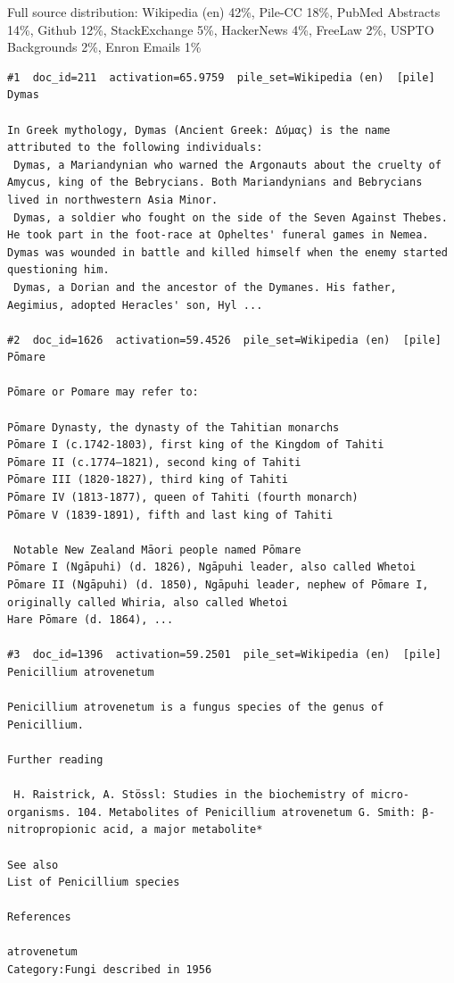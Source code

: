 Full source distribution: Wikipedia (en) 42\%, Pile-CC 18\%, PubMed Abstracts 14\%, Github 12\%, StackExchange 5\%, HackerNews 4\%, FreeLaw 2\%, USPTO Backgrounds 2\%, Enron Emails 1\%

\begin{verbatim}
#1  doc_id=211  activation=65.9759  pile_set=Wikipedia (en)  [pile]
Dymas

In Greek mythology, Dymas (Ancient Greek: Δύμας) is the name attributed to the following individuals:
 Dymas, a Mariandynian who warned the Argonauts about the cruelty of Amycus, king of the Bebrycians. Both Mariandynians and Bebrycians lived in northwestern Asia Minor.
 Dymas, a soldier who fought on the side of the Seven Against Thebes. He took part in the foot-race at Opheltes' funeral games in Nemea. Dymas was wounded in battle and killed himself when the enemy started questioning him.
 Dymas, a Dorian and the ancestor of the Dymanes. His father, Aegimius, adopted Heracles' son, Hyl ...

#2  doc_id=1626  activation=59.4526  pile_set=Wikipedia (en)  [pile]
Pōmare

Pōmare or Pomare may refer to:

Pōmare Dynasty, the dynasty of the Tahitian monarchs
Pōmare I (c.1742-1803), first king of the Kingdom of Tahiti
Pōmare II (c.1774–1821), second king of Tahiti
Pōmare III (1820-1827), third king of Tahiti
Pōmare IV (1813-1877), queen of Tahiti (fourth monarch)
Pōmare V (1839-1891), fifth and last king of Tahiti

 Notable New Zealand Māori people named Pōmare
Pōmare I (Ngāpuhi) (d. 1826), Ngāpuhi leader, also called Whetoi
Pōmare II (Ngāpuhi) (d. 1850), Ngāpuhi leader, nephew of Pōmare I, originally called Whiria, also called Whetoi
Hare Pōmare (d. 1864), ...

#3  doc_id=1396  activation=59.2501  pile_set=Wikipedia (en)  [pile]
Penicillium atrovenetum

Penicillium atrovenetum is a fungus species of the genus of Penicillium.

Further reading

 H. Raistrick, A. Stössl: Studies in the biochemistry of micro-organisms. 104. Metabolites of Penicillium atrovenetum G. Smith: β-nitropropionic acid, a major metabolite*

See also
List of Penicillium species

References

atrovenetum
Category:Fungi described in 1956


\end{verbatim}
